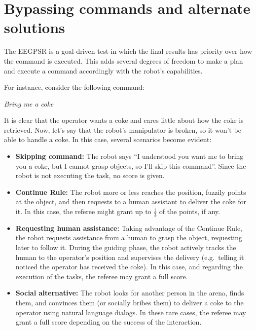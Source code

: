 \section{Bypassing commands and alternate solutions}
The EEGPSR is a goal-driven test in which the final results has priority over how the command is executed.
This adds several degrees of freedom to make a plan and execute a command accordingly with the robot's capabilities.

For instance, consider the following command:

\begin{center}
\noindent\textit{Bring me a coke}
\end{center}

It is clear that the operator wants a coke and cares little about how the coke is retrieved. Now, let's say that the robot's manipulator is broken, so it won't be able to handle a coke. In this case, several scenarios become evident:

\begin{itemize}
	\item \textbf{Skipping command:} The robot says \enquote{I understood you want me to bring you a coke, but I cannot grasp objects, so I'll skip this command}. Since the robot is not executing the task, no score is given.

	\item \textbf{Continue Rule:} The robot more or less reaches the position, fuzzily points at the object, and then requests to a human assistant to deliver the coke for it. In this case, the referee might grant up to $\frac{1}{3}$ of the points, if any.

	\item \textbf{Requesting human assistance:} Taking advantage of the Continue Rule, the robot requests assistance from a human to grasp the object, requesting later to follow it. During the guiding phase, the robot actively tracks the human to the operator's position and supervises the delivery (e.g.~telling it noticed the operator has received the coke). In this case, and regarding the execution of the tasks, the referee may grant a full score.

	\item \textbf{Social alternative:} The robot looks for another person in the arena, finds them, and convinces them (or socially bribes them) to deliver a coke to the operator using natural language dialogs. In these rare cases, the referee may grant a full score depending on the success of the interaction.
\end{itemize}

